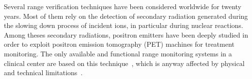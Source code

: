 Several range verification techniques have been considered worldwide for twenty years. Most of them rely on the detection of secondary radiation generated during the slowing down process of incident ions, in particular during nuclear reactions. Among theses secondary radiations, positron emitters have been deeply studied in order to exploit positron emission tomography (PET) machines for treatment monitoring. The only available and functional range monitoring systems in a clinical center are based on this technique~\cite{ENGHARDT2004, Yamaya2018}, which is anyway affected by physical and technical limitations~\cite{PARODI2016}.

%

